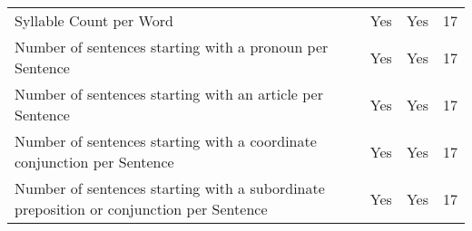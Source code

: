 \begin{table}[htbp]
\begin{tabular}{m{} c c c}
        Syllable Count per Word & Yes & Yes & 17 \\
        Number of sentences starting with a pronoun per Sentence & Yes & Yes & 17 \\
        Number of sentences starting with an article per Sentence & Yes & Yes & 17 \\
        Number of sentences starting with a coordinate conjunction per Sentence & Yes & Yes & 17 \\
        Number of sentences starting with a subordinate preposition or conjunction per Sentence & Yes & Yes & 17 \\
        \bottomrule
    \end{tabular}
\end{table}